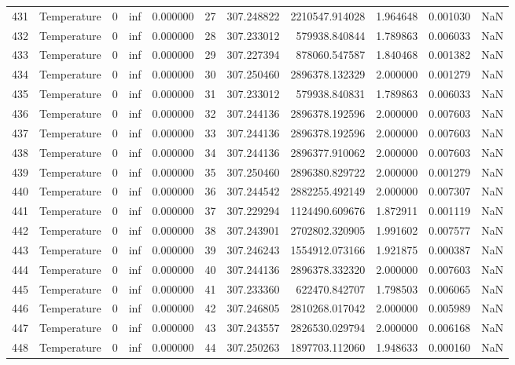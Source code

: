 \begin{tabular}{llrrrrrrrrr}
431 & Temperature & 0 & inf & 0.000000 & 27 & 307.248822 & 2210547.914028 & 1.964648 & 0.001030 & NaN \\
432 & Temperature & 0 & inf & 0.000000 & 28 & 307.233012 & 579938.840844 & 1.789863 & 0.006033 & NaN \\
433 & Temperature & 0 & inf & 0.000000 & 29 & 307.227394 & 878060.547587 & 1.840468 & 0.001382 & NaN \\
434 & Temperature & 0 & inf & 0.000000 & 30 & 307.250460 & 2896378.132329 & 2.000000 & 0.001279 & NaN \\
435 & Temperature & 0 & inf & 0.000000 & 31 & 307.233012 & 579938.840831 & 1.789863 & 0.006033 & NaN \\
436 & Temperature & 0 & inf & 0.000000 & 32 & 307.244136 & 2896378.192596 & 2.000000 & 0.007603 & NaN \\
437 & Temperature & 0 & inf & 0.000000 & 33 & 307.244136 & 2896378.192596 & 2.000000 & 0.007603 & NaN \\
438 & Temperature & 0 & inf & 0.000000 & 34 & 307.244136 & 2896377.910062 & 2.000000 & 0.007603 & NaN \\
439 & Temperature & 0 & inf & 0.000000 & 35 & 307.250460 & 2896380.829722 & 2.000000 & 0.001279 & NaN \\
440 & Temperature & 0 & inf & 0.000000 & 36 & 307.244542 & 2882255.492149 & 2.000000 & 0.007307 & NaN \\
441 & Temperature & 0 & inf & 0.000000 & 37 & 307.229294 & 1124490.609676 & 1.872911 & 0.001119 & NaN \\
442 & Temperature & 0 & inf & 0.000000 & 38 & 307.243901 & 2702802.320905 & 1.991602 & 0.007577 & NaN \\
443 & Temperature & 0 & inf & 0.000000 & 39 & 307.246243 & 1554912.073166 & 1.921875 & 0.000387 & NaN \\
444 & Temperature & 0 & inf & 0.000000 & 40 & 307.244136 & 2896378.332320 & 2.000000 & 0.007603 & NaN \\
445 & Temperature & 0 & inf & 0.000000 & 41 & 307.233360 & 622470.842707 & 1.798503 & 0.006065 & NaN \\
446 & Temperature & 0 & inf & 0.000000 & 42 & 307.246805 & 2810268.017042 & 2.000000 & 0.005989 & NaN \\
447 & Temperature & 0 & inf & 0.000000 & 43 & 307.243557 & 2826530.029794 & 2.000000 & 0.006168 & NaN \\
448 & Temperature & 0 & inf & 0.000000 & 44 & 307.250263 & 1897703.112060 & 1.948633 & 0.000160 & NaN \\

\end{tabular}
